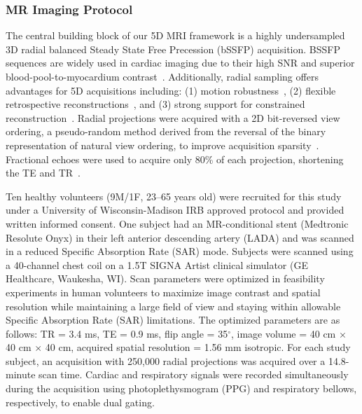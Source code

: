 \subsubsection{MR Imaging Protocol}
The central building block of our 5D MRI framework is a highly undersampled 3D radial balanced Steady State Free Precession (bSSFP) acquisition. BSSFP sequences are widely used in cardiac imaging due to their high SNR and superior blood-pool-to-myocardium contrast~\cite{bieriFundamentalsBalancedSteady2013}. Additionally, radial sampling offers advantages for 5D acquisitions including: (1) motion robustness~\cite{fengXDGRASPGoldenangleRadial2016, fengGoldenAngleRadialMRI2022}, (2) flexible retrospective reconstructions~\cite{fengGoldenAngleRadialMRI2022,iiiAdvantagesRetrospectivelyGated}, and (3) strong support for constrained reconstruction~\cite{fengGoldenAngleRadialMRI2022,lustigSparseMRIApplication2007,chanInfluenceRadialUndersampling2012}. Radial projections were acquired with a 2D bit-reversed view ordering, a pseudo-random method derived from the reversal of the binary representation of natural view ordering, to improve acquisition sparsity~\cite{chanInfluenceRadialUndersampling2012,koaySparseOptimalAcquisition2012}. Fractional echoes were used to acquire only 80\% of each projection, shortening the TE and TR~\cite{bydderMinimizingEchoRepetition2021}. 

Ten healthy volunteers (9M/1F, 23--65 years old) were recruited for this study under a University of Wisconsin-Madison IRB approved protocol and provided written informed consent. One subject had an MR-conditional stent (Medtronic Resolute Onyx) in their left anterior descending artery (LADA) and was scanned in a reduced Specific Absorption Rate (SAR) mode. Subjects were scanned using a 40-channel chest coil on a 1.5T SIGNA Artist clinical simulator (GE Healthcare, Waukesha, WI). Scan parameters were optimized in feasibility experiments in human volunteers to maximize image contrast and spatial resolution while maintaining a large field of view and staying within allowable Specific Absorption Rate (SAR) limitations. The optimized parameters are as follows: TR = 3.4 ms, TE = 0.9 ms, flip angle = 35$^\circ$, image volume = 40 cm $\times$ 40 cm $\times$ 40 cm, acquired spatial resolution = 1.56 mm isotropic. For each study subject, an acquisition with 250,000 radial projections was acquired over a 14.8-minute scan time. Cardiac and respiratory signals were recorded simultaneously during the acquisition using photoplethysmogram (PPG) and respiratory bellows, respectively, to enable dual gating.

